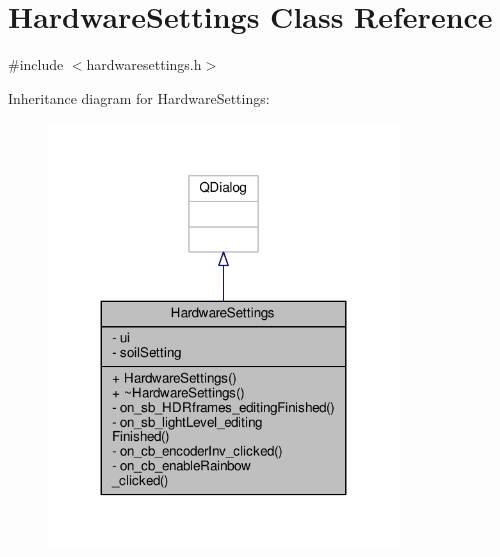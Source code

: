 \hypertarget{class_hardware_settings}{}\section{Hardware\+Settings Class Reference}
\label{class_hardware_settings}


{\ttfamily \#include $<$hardwaresettings.\+h$>$}



Inheritance diagram for Hardware\+Settings\+:\nopagebreak
\begin{figure}[H]
\begin{center}
\leavevmode
\includegraphics[width=263pt]{class_hardware_settings__inherit__graph}
\end{center}
\end{figure}


